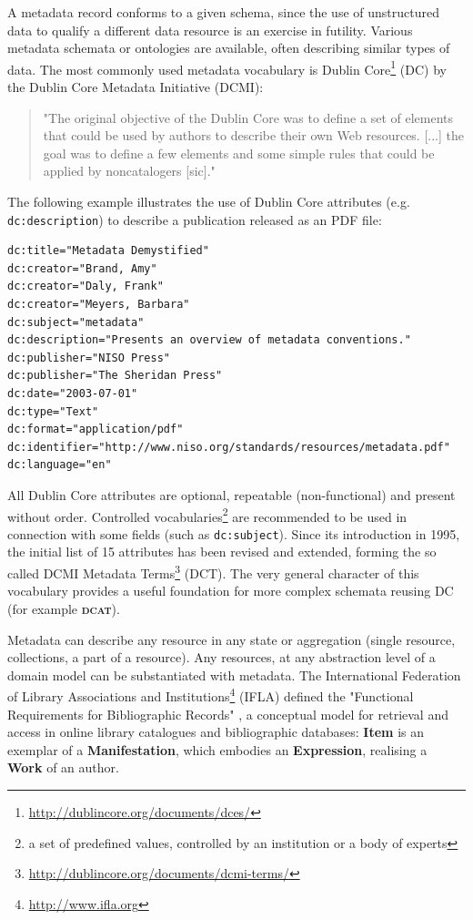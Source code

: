 \documentclass[a4paper,english,twoside,BCOR1.5cm,headsepline,DIV12,appendixprefix,final,12pt]{scrbook}
\newcommand{\dcat}{{\scshape\bfseries dcat}\xspace}
\newcommand{\prop}[1]{{{\texttt{#1}}}}
\newcommand\footnoteurl[1]{\footnote{\scriptsize\url{#1}}}
\begin{document}
A metadata record conforms to a given schema, since the use of unstructured data to qualify a different data resource is an exercise in futility. Various metadata schemata or ontologies are available, often describing similar types of data. The most commonly used metadata vocabulary is Dublin Core\footnoteurl{http://dublincore.org/documents/dces/} (DC) by the Dublin Core Metadata Initiative (DCMI):

\begin{quote}
"The original objective of the
Dublin Core was to define a set of
elements that could be used by
authors to describe their own Web
resources. [...] the goal was to define a
few elements and some simple
rules that could be applied by
noncatalogers [sic]." \cite{NISO2004}
\end{quote}

The following example illustrates the use of Dublin Core attributes (e.g. \prop{dc:description}) to describe a publication released as an PDF file:

\begin{lstlisting}[language=ttl, captionpos=b, caption=Dublin Core example, label=lst:dcex,linewidth=\columnwidth,breaklines=true]
dc:title="Metadata Demystified"
dc:creator="Brand, Amy"
dc:creator="Daly, Frank"
dc:creator="Meyers, Barbara"
dc:subject="metadata"
dc:description="Presents an overview of metadata conventions."
dc:publisher="NISO Press"
dc:publisher="The Sheridan Press"
dc:date="2003-07-01"
dc:type="Text"
dc:format="application/pdf"
dc:identifier="http://www.niso.org/standards/resources/metadata.pdf"
dc:language="en"
\end{lstlisting}

All Dublin Core attributes are optional, repeatable (non-functional) and present without order. Controlled vocabularies\footnote{a set of predefined values, controlled by an institution or a body of experts} are recommended to be used in connection with some fields (such as \prop{dc:subject}). Since its introduction in 1995, the initial list of 15 attributes has been revised and extended, forming the so called DCMI Metadata Terms\footnoteurl{http://dublincore.org/documents/dcmi-terms/} (DCT). The very general character of this vocabulary provides a useful foundation for more complex schemata reusing DC (for example \dcat).

Metadata can describe any resource in any state or aggregation (single resource, collections, a part of a resource). Any resources, at any abstraction level of a domain model can be substantiated with metadata.
The International Federation of Library Associations and Institutions\footnoteurl{http://www.ifla.org} (IFLA) defined the "Functional Requirements for Bibliographic Records" \cite{IFLA-Functional-1998}, a conceptual model for retrieval and access in online library catalogues and bibliographic databases: \textbf{Item} is an exemplar of a \textbf{Manifestation}, which embodies an \textbf{Expression}, realising a \textbf{Work} of an author.
\end{document}
